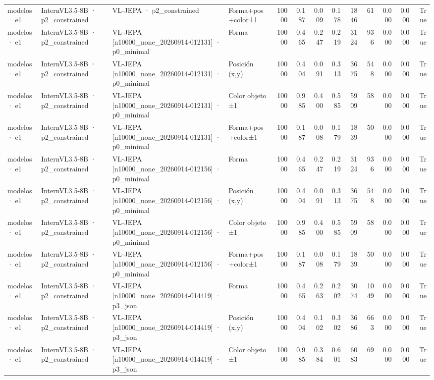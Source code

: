 \begin{tabular}{llllrrrrrrrrr}
modelos · e1 & InternVL3.5-8B · p2\_constrained & VL-JEPA · p2\_constrained & Forma+pos+color±1 & 10000 & 0.187 & 0.009 & 0.178 & 1846 & 61 & 0.000 & 0.000 & True \\
modelos · e1 & InternVL3.5-8B · p2\_constrained & VL-JEPA [n10000\_none\_20260914-012131] · p0\_minimal & Forma & 10000 & 0.465 & 0.247 & 0.219 & 3124 & 936 & 0.000 & 0.000 & True \\
modelos · e1 & InternVL3.5-8B · p2\_constrained & VL-JEPA [n10000\_none\_20260914-012131] · p0\_minimal & Posición (x,y) & 10000 & 0.404 & 0.091 & 0.313 & 3675 & 548 & 0.000 & 0.000 & True \\
modelos · e1 & InternVL3.5-8B · p2\_constrained & VL-JEPA [n10000\_none\_20260914-012131] · p0\_minimal & Color objeto ±1 & 10000 & 0.985 & 0.400 & 0.585 & 5909 & 58 & 0.000 & 0.000 & True \\
modelos · e1 & InternVL3.5-8B · p2\_constrained & VL-JEPA [n10000\_none\_20260914-012131] · p0\_minimal & Forma+pos+color±1 & 10000 & 0.187 & 0.008 & 0.179 & 1839 & 50 & 0.000 & 0.000 & True \\
modelos · e1 & InternVL3.5-8B · p2\_constrained & VL-JEPA [n10000\_none\_20260914-012156] · p0\_minimal & Forma & 10000 & 0.465 & 0.247 & 0.219 & 3124 & 936 & 0.000 & 0.000 & True \\
modelos · e1 & InternVL3.5-8B · p2\_constrained & VL-JEPA [n10000\_none\_20260914-012156] · p0\_minimal & Posición (x,y) & 10000 & 0.404 & 0.091 & 0.313 & 3675 & 548 & 0.000 & 0.000 & True \\
modelos · e1 & InternVL3.5-8B · p2\_constrained & VL-JEPA [n10000\_none\_20260914-012156] · p0\_minimal & Color objeto ±1 & 10000 & 0.985 & 0.400 & 0.585 & 5909 & 58 & 0.000 & 0.000 & True \\
modelos · e1 & InternVL3.5-8B · p2\_constrained & VL-JEPA [n10000\_none\_20260914-012156] · p0\_minimal & Forma+pos+color±1 & 10000 & 0.187 & 0.008 & 0.179 & 1839 & 50 & 0.000 & 0.000 & True \\
modelos · e1 & InternVL3.5-8B · p2\_constrained & VL-JEPA [n10000\_none\_20260914-014419] · p3\_json & Forma & 10000 & 0.465 & 0.263 & 0.202 & 3074 & 1049 & 0.000 & 0.000 & True \\
modelos · e1 & InternVL3.5-8B · p2\_constrained & VL-JEPA [n10000\_none\_20260914-014419] · p3\_json & Posición (x,y) & 10000 & 0.404 & 0.102 & 0.302 & 3686 & 663 & 0.000 & 0.000 & True \\
modelos · e1 & InternVL3.5-8B · p2\_constrained & VL-JEPA [n10000\_none\_20260914-014419] · p3\_json & Color objeto ±1 & 10000 & 0.985 & 0.384 & 0.601 & 6083 & 69 & 0.000 & 0.000 & True \\

\end{tabular}
